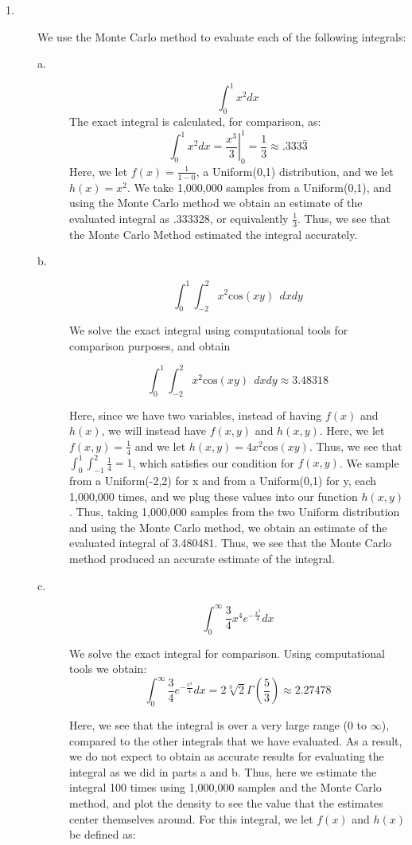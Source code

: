 \documentclass[12pt]{article}
\renewcommand{\title}[1]{\textbf{#1}\\}
\begin{document}
\center{\title{STAT 243 HW\#4}}

\begin{description}


\item[1.] We use the Monte Carlo method to evaluate each of the following integrals:
\begin{description}
\item[a.] \[\int_0^1 x^2 dx\]
The exact integral is calculated, for comparison, as:
\[\int_0^1 x^2 dx = \left. \frac{x^3}{3} \right|_0^1 = \frac{1}{3} \approx .333\bar{3} \]
Here, we let $f(x) = \frac{1}{1-0}$, a Uniform(0,1) distribution, and we let $h(x) = x^2$. We take 1,000,000 samples from a Uniform(0,1), and using the Monte Carlo method we obtain an estimate of the evaluated integral as .333328, or equivalently $\frac{1}{3}$. Thus, we see that the Monte Carlo Method estimated the integral accurately. 

\item[b.] \[\int_0^1 \int^2_{-2} x^2 \mathrm{cos}(xy) \ \ dx dy\]

We solve the exact integral using computational tools for comparison purposes, and obtain

\[\int_0^1 \int^2_{-2} x^2 \mathrm{cos}(xy) \ \ dx dy \approx 3.48318\]

Here, since we have two variables, instead of having $f(x)$ and $h(x)$, we will instead have $f(x,y)$ and $h(x,y)$. Here, we let $f(x,y) = \frac{1}{4}$ and we let $h(x,y) = 4x^2\mathrm{cos}(xy)$. Thus, we see that $\int_0^1 \int_{-1}^2 \frac{1}{4} = 1$, which satisfies our condition for $f(x,y)$. We sample from a Uniform(-2,2) for x and from a Uniform(0,1) for y, each 1,000,000 times, and we plug these values into our function $h(x,y)$. Thus, taking 1,000,000 samples from the two Uniform distribution and using the Monte Carlo method, we obtain an estimate of the evaluated integral of 3.480481. Thus, we see that the Monte Carlo method produced an accurate estimate of the integral. 

\item[c.] \[\int_0^\infty \frac{3}{4} x^4 e^{-\frac{x^3}{4}} dx\]

We solve the exact integral for comparison. Using computational tools we obtain:
\[\int_0^\infty \frac{3}{4} e^{-\frac{x^3}{4}} dx = 2 \sqrt[3]{2} \Gamma \left( \frac{5}{3} \right) \approx 2.27478 \]

Here, we see that the integral is over a very large range (0 to $\infty$), compared to the other integrals that we have evaluated. As a result, we do not expect to obtain as accurate results for evaluating the integral as we did in parts a and b. Thus, here we estimate the integral 100 times using 1,000,000 samples and the Monte Carlo method, and plot the density to see the value that the estimates center themselves around. For this integral, we let $f(x)$ and $h(x)$ be defined as:


\end{description}
\end{description}
\end{document}
